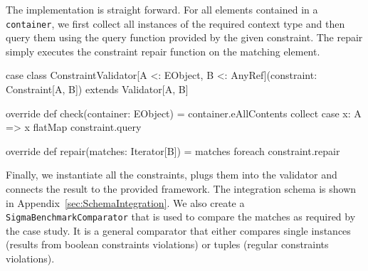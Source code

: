 The implementation is straight forward.
For all elements contained in a \texttt{container}, we first collect all instances of the required context type and then query them using the query function provided by the given constraint.
The repair simply executes the constraint repair function on the matching element.
%
\begin{scalacode}
case class ConstraintValidator[A <: EObject, B <: AnyRef](constraint: Constraint[A, B]) 
  extends Validator[A, B] {
  
  override def check(container: EObject) =
    container.eAllContents collect { case x: A => x } flatMap constraint.query

  override def repair(matches: Iterator[B]) = 
    matches foreach constraint.repair
}
\end{scalacode}

Finally, we instantiate all the constraints, plugs them into the validator and connects the result to the provided framework.
The integration schema is shown in Appendix~\ref{sec:SchemaIntegration}.
We also create a \texttt{SigmaBenchmarkComparator} that is used to compare the matches as required by the case study.
It is a general comparator that either compares single instances (results from boolean constraints violations) or tuples (regular constraints violations).